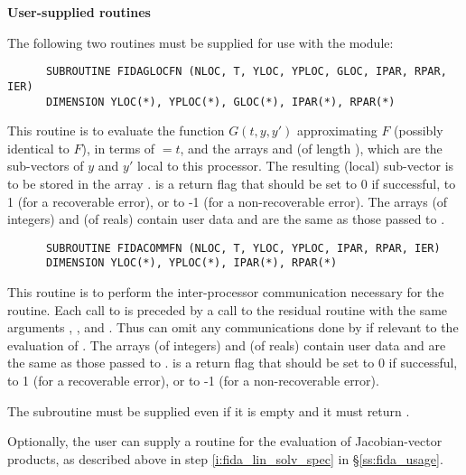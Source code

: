 \begin{Steps}
\item {\bf User-supplied routines}

  The following two routines must be supplied for use with the {\idabbdpre}
  module:
\begin{verbatim}
      SUBROUTINE FIDAGLOCFN (NLOC, T, YLOC, YPLOC, GLOC, IPAR, RPAR, IER)
      DIMENSION YLOC(*), YPLOC(*), GLOC(*), IPAR(*), RPAR(*)
\end{verbatim}
  This routine is to evaluate the function $G(t,y,y')$ approximating $F$
  (possibly identical to $F$), in terms of  $ = t$, and the arrays
   and  (of length ), which are the sub-vectors
  of $y$ and $y'$ local to this processor.  The resulting (local) sub-vector
  is to be stored in the array .   is a return flag that
  should be set to 0 if successful, to 1 (for a recoverable error), or to
  -1 (for a non-recoverable error).
  The arrays  (of integers) and  (of reals) contain user data
  and are the same as those passed to .

\begin{verbatim}
      SUBROUTINE FIDACOMMFN (NLOC, T, YLOC, YPLOC, IPAR, RPAR, IER)
      DIMENSION YLOC(*), YPLOC(*), IPAR(*), RPAR(*)
\end{verbatim}
  This routine is to perform the inter-processor communication necessary
  for the  routine.
  Each call to  is preceded by a call to the residual routine
   with the same arguments , , and .
  Thus  can omit any communications done by  if
  relevant to the evaluation of .
  The arrays  (of integers) and  (of reals) contain user data
  and are the same as those passed to .
   is a return flag that should be set to 0 if successful, to 1
  (for a recoverable error), or to -1 (for a non-recoverable error).

  {\warn}The subroutine  must be supplied even if it is empty and it must
  return .

  Optionally, the user can supply a routine  for the evaluation of
  Jacobian-vector products, as described above in step \ref{i:fida_lin_solv_spec}
  in \S\ref{ss:fida_usage}.

\end{Steps}
